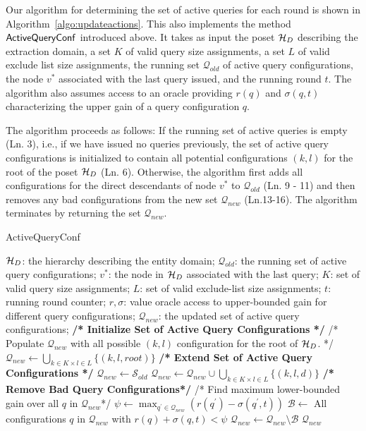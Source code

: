 Our algorithm for determining the set of active queries for each round is shown in Algorithm~\ref{algo:updateactions}. This also implements the method ${\sf ActiveQueryConf}$ introduced above. It takes as input the poset $\mathcal{H}_D$ describing the extraction domain, a set $K$ of valid query size assignments, a set $L$ of valid exclude list size assignments, the running set $\mathcal{Q}_{old}$ of active query configurations, the node $v^*$ associated with the last query issued, and the running round $t$. The algorithm also assumes access to an oracle providing $r(q)$ and $\sigma(q,t)$ characterizing the upper gain of a query configuration $q$.

The algorithm proceeds as follows: If the running set of active queries is empty (Ln. 3), i.e., if we have issued no queries previously, the set of active query configurations is initialized to contain all potential configurations $(k,l)$ for the root of the poset $\mathcal{H}_D$ (Ln. 6). Otherwise, the algorithm first adds all configurations for the direct descendants of node $v^*$ to $\mathcal{Q}_{old}$ (Ln. 9 - 11) and then removes any bad configurations from the new set $\mathcal{Q}_{new}$ (Ln.13-16). The algorithm terminates by returning the set $\mathcal{Q}_{new}$.

\begin{algorithm}[h]
\footnotesize\caption{ActiveQueryConf}
\label{algo:updateactions}
\begin{algorithmic}[1]
 $\mathcal{H}_D$: the hierarchy describing the entity domain; $\mathcal{Q}_{old}$: the running set of active query configurations; $v^*$: the node in $\mathcal{H}_D$ associated with the last query; $K$: set of valid query size assignments; $L$: set of valid exclude-list size assignments; $t$: running round counter; $r,\sigma$: value oracle access to upper-bounded gain for different query configurations;
 $\mathcal{Q}_{new}$: the updated set of active query configurations;
	\STATE \textbf{/* Initialize Set of Active Query Configurations */}
	\STATE /* Populate ${\mathcal{Q}_{new}}$ with all possible $(k,l)$ configuration for the root of $\mathcal{H}_D$. */
	\STATE ${\mathcal{Q}_{new}} \leftarrow \bigcup_{k \in K \times l \in L} \{ (k,l,root) \}$
\ELSE
	\STATE \textbf{/* Extend Set of Active Query Configurations */}
	\STATE $\mathcal{Q}_{new} \leftarrow \mathcal{S}_{old}$
	\STATE $\mathcal{Q}_{new} \leftarrow \mathcal{Q}_{new} \cup \bigcup_{k \in K \times l \in L} \{(k,l,d)\}$
	\ENDFOR
	\STATE \textbf{/* Remove Bad Query Configurations*/}
	\STATE /* Find maximum lower-bounded gain over all $q$ in $\mathcal{Q}_{new}$*/
	\STATE $\psi \leftarrow \max_{q^{\prime} \in \mathcal{Q}_{new}} (r(q^{\prime}) - \sigma(q^{\prime},t))$  
	\STATE $\mathcal{B} \leftarrow$ All configurations $q$ in $\mathcal{Q}_{new}$ with $r(q) + \sigma(q,t) < \psi$
	\STATE $\mathcal{Q}_{new} \leftarrow \mathcal{Q}_{new} \setminus \mathcal{B}$
\ENDIF 
\RETURN $\mathcal{Q}_{new}$
\end{algorithmic}
\end{algorithm}
\vspace{-5pt}
